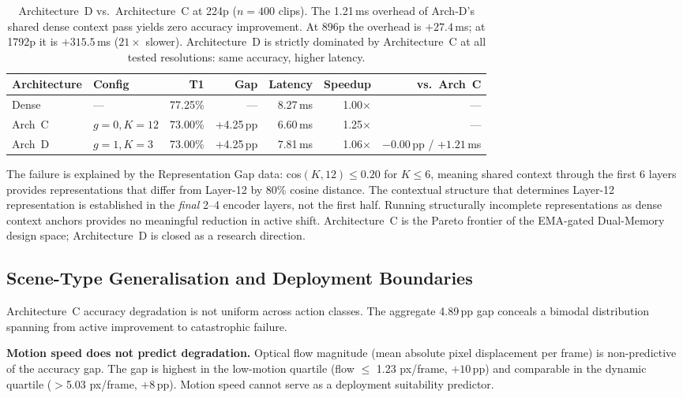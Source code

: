\documentclass{article}
\begin{document}
\begin{table}[htbp]
\centering
\setlength{\tabcolsep}{4pt}
\renewcommand{\arraystretch}{1.12}
\begin{tabular}{llrrrrr}
\toprule
\textbf{Architecture} & \textbf{Config} & \textbf{T1} & \textbf{Gap}
  & \textbf{Latency} & \textbf{Speedup} & \textbf{vs.\ Arch~C} \\
\midrule
Dense   & ---         & 77.25\% & ---     & 8.27\,ms & 1.00$\times$ & --- \\
Arch~C  & $g=0, K=12$ & 73.00\% & +4.25\,pp & 6.60\,ms & 1.25$\times$ & --- \\
Arch~D  & $g=1, K=3$  & 73.00\% & +4.25\,pp & 7.81\,ms & 1.06$\times$
  & $-0.00$\,pp / $+1.21$\,ms \\
\bottomrule
\end{tabular}
\caption{Architecture~D vs.\ Architecture~C at 224p ($n=400$ clips).
The 1.21\,ms overhead of Arch-D's shared dense context pass yields zero
accuracy improvement. At 896p the overhead is $+27.4$\,ms; at 1792p it
is $+315.5$\,ms ($21\times$ slower). Architecture~D is strictly dominated
by Architecture~C at all tested resolutions: same accuracy, higher latency.}
\label{tab:arch-d-comparison}
\end{table}

The failure is explained by the Representation Gap data: cos$(K, 12)
\leq 0.20$ for $K \leq 6$, meaning shared context through the first 6
layers provides representations that differ from Layer-12 by 80\% cosine
distance. The contextual structure that determines Layer-12 representation
is established in the \emph{final} 2--4 encoder layers, not the first half.
Running structurally incomplete representations as dense context anchors
provides no meaningful reduction in active shift. Architecture~C is the
Pareto frontier of the EMA-gated Dual-Memory design space; Architecture~D
is closed as a research direction.

\subsection{Scene-Type Generalisation and Deployment Boundaries}
\label{sec:motion-generalisation}

Architecture~C accuracy degradation is not uniform across action classes.
The aggregate 4.89\,pp gap conceals a bimodal distribution spanning
from active improvement to catastrophic failure.

\textbf{Motion speed does not predict degradation.}
Optical flow magnitude (mean absolute pixel displacement per frame) is
non-predictive of the accuracy gap. The gap is highest in the low-motion
quartile (flow $\leq$ 1.23 px/frame, $+10$\,pp) and comparable in the
dynamic quartile ($>$5.03 px/frame, $+8$\,pp). Motion speed cannot serve
as a deployment suitability predictor.
\end{document}
